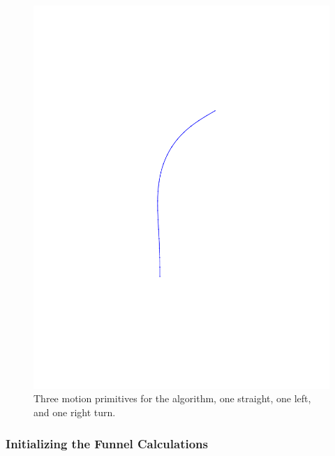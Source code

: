 \begin{figure}
\begin{minipage}[c]{0.3\textwidth}
    \includegraphics[trim={5cm 5cm 5cm 5cm},
    width=\textwidth]{figures/method/right-trajector}
  \end{minipage}
  \caption[Three motion primitives for the \rrtfunnel{} algorithm]{Three motion primitives for the \rrtfunnel{} algorithm, one straight,
    one left, and one right turn.}
  \label{fig:initial-trajectories}
\end{figure}

\subsubsection{Initializing the Funnel Calculations}
\label{subsec:initializing-tvlqr}

